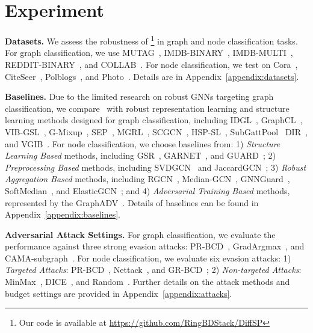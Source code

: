 
\section{Experiment}
\textbf{Datasets.} 
We assess the robustness of \ModelName\footnote{Our code is available at \url{https://github.com/RingBDStack/DiffSP}} in graph and node classification tasks. 
For graph classification, we use MUTAG~\cite{ivanov2019understanding}, IMDB-BINARY~\cite{ivanov2019understanding}, IMDB-MULTI~\cite{ivanov2019understanding}, REDDIT-BINARY~\cite{ivanov2019understanding}, and COLLAB~\cite{ivanov2019understanding}. For node classification, we test on Cora~\cite{yang2016revisiting}, CiteSeer~\cite{yang2016revisiting}, Polblogs~\cite{adamic2005political}, and Photo~\cite{shchur2018pitfalls}. Details are in Appendix~\ref{appendix:datasets}.

\noindent\textbf{Baselines.} 
Due to the limited research on robust GNNs targeting graph classification, we compare \ModelName\ with robust representation learning and structure learning methods designed for graph classification, including IDGL~\cite{chen2020iterative}, GraphCL~\cite{you2020graph}, VIB-GSL~\cite{sun2022graph}, G-Mixup~\cite{han2022g}, SEP~\cite{wu2022structural}, MGRL~\cite{ma2023multi}, SCGCN~\cite{zhao2024graph}, HSP-SL~\cite{zhang2019hierarchical}, SubGattPool~\cite{bandyopadhyay2020hierarchically} DIR~\cite{wu2022discovering}, and VGIB~\cite{yu2022improving}.
For node classification, we choose baselines from: 1) \textit{Structure Learning Based} methods, including GSR~\cite{zhao2023self}, GARNET~\cite{deng2022garnet}, and GUARD~\cite{li2023guard}; 2) \textit{Preprocessing Based} methods, including SVDGCN~\cite{entezari2020all} and JaccardGCN~\cite{wu2019adversarial}; 3) \textit{Robust Aggregation Based} methods, including RGCN~\cite{zhu2019robust}, Median-GCN~\cite{chen2021understanding}, GNNGuard~\cite{zhang2020gnnguard}, SoftMedian~\cite{geisler2021robustness}, and ElasticGCN~\cite{liu2021elastic}; and 4) \textit{Adversarial Training Based} methods, represented by the GraphADV~\cite{xu2019topology}.
Details of baselines can be found in Appendix~\ref{appendix:baselines}.

\noindent\textbf{Adversarial Attack Settings.}
For graph classification, we evaluate the performance against three strong evasion attacks: PR-BCD~\cite{geisler2021robustness}, GradArgmax~\cite{dai2018adversarial}, and CAMA-subgraph~\cite{wang2023revisiting}. 
For node classification, we evaluate six evasion attacks: 1) \textit{Targeted Attacks}: PR-BCD~\cite{geisler2021robustness}, Nettack~\cite{zugner2018adversarial}, and GR-BCD~\cite{geisler2021robustness}; 2) \textit{Non-targeted Attacks}: MinMax~\cite{li2020deeprobust}, DICE~\cite{zugner2018metalearningu}, and Random~\cite{li2020deeprobust}.
Further details on the attack methods and budget settings are provided in Appendix~\ref{appendix:attacks}.

